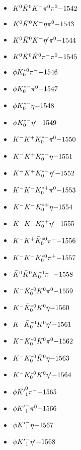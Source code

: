 \begin{multicols}{3}
\begin{itemize}
 \item $ K^{0} \bar{K}^{0} K^{-} \pi^{0} \pi^{0} \hfill{-1542}$
 \item $ K^{0} \bar{K}^{0} K^{-} \eta \pi^{0} \hfill{-1543}$
 \item $ K^{0} \bar{K}^{0} K^{-} {\eta^{\prime}} \pi^{0} \hfill{-1544}$
 \item $ K^{0} \bar{K}^{0} \bar{K}^{0} \pi^{-} \pi^{0} \hfill{-1545}$
 \item $ \phi \bar{K}_{0}^{*0} \pi^{-} \hfill{-1546}$
 \item $ \phi K_{0}^{*-} \pi^{0} \hfill{-1547}$
 \item $ \phi K_{0}^{*-} \eta \hfill{-1548}$
 \item $ \phi K_{0}^{*-} {\eta^{\prime}} \hfill{-1549}$
 \item $ K^{-} K^{+} K_{0}^{*-} \pi^{0} \hfill{-1550}$
 \item $ K^{-} K^{+} K_{0}^{*-} \eta \hfill{-1551}$
 \item $ K^{-} K^{+} K_{0}^{*-} {\eta^{\prime}} \hfill{-1552}$
 \item $ K^{-} K^{-} K_{0}^{*+} \pi^{0} \hfill{-1553}$
 \item $ K^{-} K^{-} K_{0}^{*+} \eta \hfill{-1554}$
 \item $ K^{-} K^{-} K_{0}^{*+} {\eta^{\prime}} \hfill{-1555}$
 \item $ K^{-} K^{+} \bar{K}_{0}^{*0} \pi^{-} \hfill{-1556}$
 \item $ K^{-} K^{-} K_{0}^{*0} \pi^{+} \hfill{-1557}$
 \item $ \bar{K}^{0} \bar{K}^{0} K_{0}^{*0} \pi^{-} \hfill{-1558}$
 \item $ K^{-} \bar{K}_{0}^{*0} K^{0} \pi^{0} \hfill{-1559}$
 \item $ K^{-} \bar{K}_{0}^{*0} K^{0} \eta \hfill{-1560}$
 \item $ K^{-} \bar{K}_{0}^{*0} K^{0} {\eta^{\prime}} \hfill{-1561}$
 \item $ K^{-} K_{0}^{*0} \bar{K}^{0} \pi^{0} \hfill{-1562}$
 \item $ K^{-} K_{0}^{*0} \bar{K}^{0} \eta \hfill{-1563}$
 \item $ K^{-} K_{0}^{*0} \bar{K}^{0} {\eta^{\prime}} \hfill{-1564}$
 \item $ \phi \bar{{K^{\prime}}}_{1}^{0} \pi^{-} \hfill{-1565}$
 \item $ \phi {K^{\prime}}_{1}^{-} \pi^{0} \hfill{-1566}$
 \item $ \phi {K^{\prime}}_{1}^{-} \eta \hfill{-1567}$
 \item $ \phi {K^{\prime}}_{1}^{-} {\eta^{\prime}} \hfill{-1568}$

\end{itemize}
\end{multicols}
